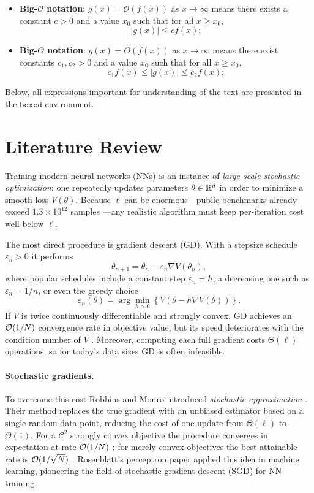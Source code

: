 \documentclass[12pt]{article}
\begin{document}
\begin{itemize}
    \item \textbf{Big-$\mathcal{O}$ notation}: $g(x) = \mathcal{O}(f(x))$ as $x \to \infty$ means there exists a constant $c > 0$ and a value $x_0$ such that for all $x \ge x_0$,
    \[
        |g(x)| \le c f(x);
    \]
    \item \textbf{Big-$\Theta$ notation}: $g(x) = \Theta(f(x))$ as $x \to \infty$ means there exist constants $c_1, c_2 > 0$ and a value $x_0$ such that for all $x \ge x_0$,
    \[
        c_1 f(x) \le |g(x)| \le c_2 f(x);
    \]
\end{itemize}



Below, all expressions important for understanding of the text are presented in the $\texttt{boxed}$ environment.


\section{Literature Review}
\label{literature review}

Training modern neural networks (NNs) is an instance of \emph{large‐scale stochastic optimization}: one repeatedly updates parameters \(\theta\in{\mathbb{R}}^{d}\) in order to minimize a smooth loss \(V(\theta)\).  Because \(\ell\) can be enormous---public benchmarks already exceed \(1.3\times10^{12}\) samples \cite{she24}---any realistic algorithm must keep per‐iteration cost well below \(\ell\).

The most direct procedure is gradient descent (GD).  With a stepsize schedule \(\varepsilon_{n}>0\) it performs
\[
\theta_{n+1}=\theta_{n}-\varepsilon_{n}\nabla V(\theta_{n}),
\]
where popular schedules include a constant step \(\varepsilon_{n}=h\), a decreasing one such as \(\varepsilon_{n}=1/n\), or even the greedy choice
\[
\varepsilon_{n}(\theta) = \arg\min_{h>0} \left\{ V\left(\theta - h \nabla V(\theta)\right) \right\}.
\]
If \(V\) is twice continuously differentiable and strongly convex, GD achieves an \(\mathcal{O}(1/N)\) convergence rate in objective value, but its speed deteriorates with the condition number of \(V\) \cite{bv04}.  Moreover, computing each full gradient costs \(\Theta(\ell)\) operations, so for today's data sizes GD is often infeasible.

\paragraph{Stochastic gradients.}
\label{para: Stochastic gradients}
To overcome this cost Robbins and Monro introduced \emph{stochastic approximation} \cite{rm51}.  Their method replaces the true gradient with an unbiased estimator based on a single random data point, reducing the cost of one update from \(\Theta(\ell)\) to \(\Theta(1)\).  For a \(\mathcal C^{2}\) strongly convex objective the procedure converges in expectation at rate \(\mathcal{O}(1/N)\) \cite{njl09}; for merely convex objectives the best attainable rate is \(\mathcal{O}(1/\sqrt{N})\) \cite{ny83}.  Rosenblatt's perceptron paper \cite{r58} applied this idea in machine learning, pioneering the field of stochastic gradient descent (SGD) for NN training.
\end{document}
